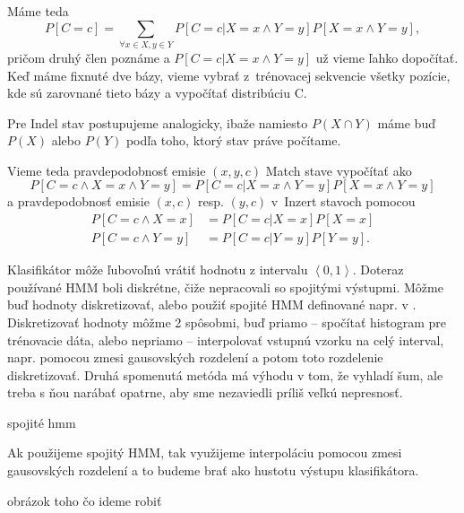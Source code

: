 Máme teda
$$P\left[C=c\right] = \sum_{\forall x\in X, y \in Y} P\left[C=c | X=x \wedge Y=y\right] P\left[X=x \wedge Y=y\right],$$
pričom druhý člen poznáme a $P\left[C=c | X=x \wedge Y=y\right]$ už vieme ľahko dopočítať. Keď máme fixnuté dve bázy, vieme vybrať z~trénovacej sekvencie všetky pozície, kde sú zarovnané tieto bázy a vypočítať distribúciu C.

Pre Indel stav postupujeme analogicky, ibaže namiesto $P(X \cap Y)$ máme buď $P(X)$ alebo $P(Y)$ podľa toho, ktorý stav práve počítame.

Vieme teda pravdepodobnosť emisie $(x, y, c)$ Match stave vypočítať ako $$P\left[C=c \wedge X=x \wedge Y=y\right] = P\left[C=c | X=x \wedge Y=y\right] P\left[X=x \wedge Y=y\right]$$ a pravdepodobnosť emisie $(x, c)$ resp. $(y, c)$  v~Inzert stavoch pomocou
\begin{align*}
P\left[C=c \wedge X=x\right] &= P\left[C=c | X=x\right] P\left[X=x\right]\\
P\left[C=c \wedge Y=y\right] &= P\left[C=c | Y=y\right] P\left[Y=y\right].
\end{align*}

Klasifikátor môže ľubovoľnú vrátiť hodnotu z intervalu $\left<0,1 \right>$. Doteraz používané HMM boli diskrétne, čiže nepracovali so spojitými výstupmi. Môžme buď hodnoty diskretizovať, alebo použiť spojité HMM definované napr. v \cite{huang1989multiple}. Diskretizovať hodnoty môžme 2 spôsobmi, buď priamo -- spočítať histogram pre trénovacie dáta, alebo nepriamo -- interpolovať vstupnú vzorku na celý interval, napr. pomocou zmesi gausovských rozdelení a potom toto rozdelenie diskretizovať. Druhá spomenutá metóda má výhodu v tom, že vyhladí šum, ale treba s ňou narábať opatrne, aby sme nezaviedli príliš veľkú nepresnosť.

\todo spojité hmm

Ak použijeme spojitý HMM, tak využijeme interpoláciu pomocou zmesi gausovských rozdelení a to budeme brať ako hustotu výstupu klasifikátora.

\todo obrázok toho čo ideme robiť


